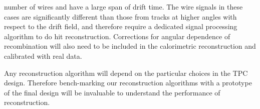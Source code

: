 \begin{itemize}
\begin{itemize}
number of wires and have a large span of drift time. The wire signals in these
cases are significantly different than those from tracks at higher angles with
respect to the drift field, and therefore require a dedicated signal processing
algorithm to do hit reconstruction. Corrections for angular dependence of
recombination will also need to be included in the calorimetric reconstruction
and calibrated with real data.
\end{itemize}
\end{itemize}


Any reconstruction algorithm will depend on the particular choices in the TPC design. 
Therefore bench-marking our reconstruction algorithms with a prototype of the final design will
be invaluable to understand the performance of reconstruction.

